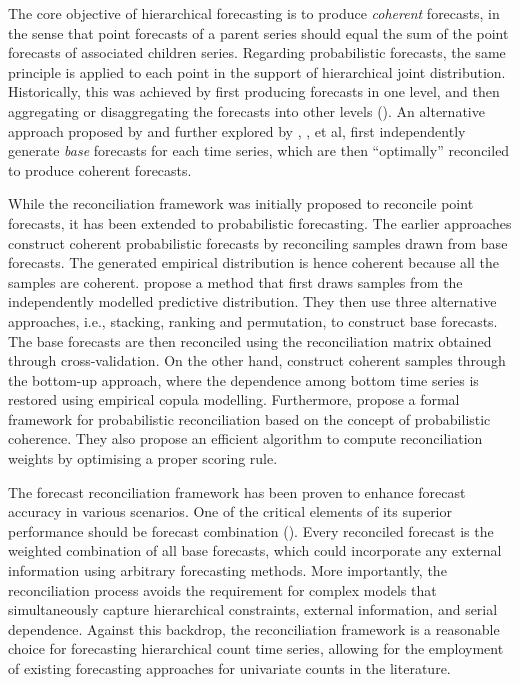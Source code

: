 \documentclass[a4paper,review,12pt,authoryear]{elsarticle}
\begin{document}
The core objective of hierarchical forecasting is to produce \textit{coherent} forecasts, 
in the sense that point forecasts of a parent series should equal the sum of the point forecasts of associated children series. 
Regarding probabilistic forecasts, the same principle is applied to each point in the support of hierarchical joint distribution.
Historically, this was achieved by first producing forecasts in one level, 
and then aggregating or disaggregating the forecasts into other levels (\citealp{fliednerHierarchicalForecastingIssues2001}). 
An alternative approach proposed by \cite{hyndmanOptimalCombinationForecasts2011} and further explored by \cite{wickramasuriyaOptimalForecastReconciliation2019}, \cite{ anagiotelisForecastReconciliationGeometric2021}, et al, 
first independently generate \textit{base} forecasts for each time series, 
which are then ``optimally'' reconciled to produce coherent forecasts.

While the reconciliation framework was initially proposed to reconcile point forecasts, it has been extended to probabilistic forecasting. 
The earlier approaches construct coherent probabilistic forecasts by reconciling samples drawn from base forecasts. 
The generated empirical distribution is hence coherent because all the samples are coherent.
\cite{jeonProbabilisticForecastReconciliation2019} propose a method that first draws samples from the independently modelled predictive distribution. 
They then use three alternative approaches, i.e., stacking, ranking and permutation, to construct base forecasts. 
The base forecasts are then reconciled using the reconciliation matrix obtained through cross-validation. 
On the other hand, \cite{bentaiebHierarchicalProbabilisticForecasting2020} construct coherent samples through the bottom-up approach, 
where the dependence among bottom time series is restored using empirical copula modelling.
Furthermore, \cite{panagiotelisProbabilisticForecastReconciliation2022} propose a formal framework for probabilistic reconciliation based on the concept of probabilistic coherence. 
They also propose an efficient algorithm to compute reconciliation weights by optimising a proper scoring rule. 

The forecast reconciliation framework has been proven to enhance forecast accuracy in various scenarios. 
One of the critical elements of its superior performance should be forecast combination (\citealp{hollymanUnderstandingForecastReconciliation2021}). 
Every reconciled forecast is the weighted combination of all base forecasts,
which could incorporate any external information using arbitrary forecasting methods.
More importantly, the reconciliation process avoids the requirement for complex models that simultaneously capture hierarchical constraints, external information, and serial dependence.
Against this backdrop, the reconciliation framework is a reasonable choice for forecasting hierarchical count time series,
allowing for the employment of existing forecasting approaches for univariate counts in the literature.
\end{document}
